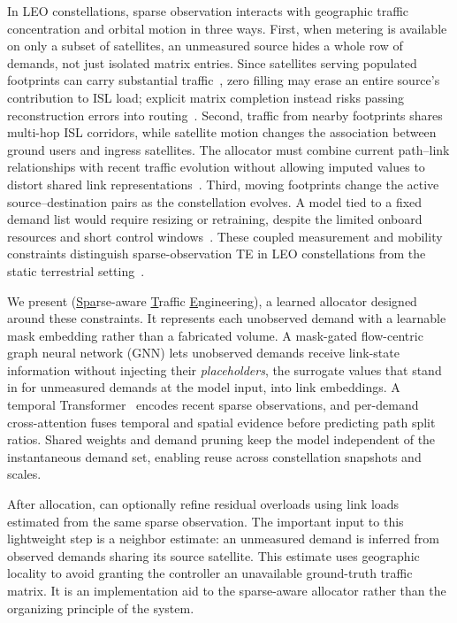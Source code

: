 In LEO constellations, sparse observation interacts with geographic traffic
concentration and orbital motion in three ways. First, when metering is
available on only a subset of satellites, an unmeasured source hides a whole
row of demands, not just isolated matrix entries. Since satellites serving
populated footprints can carry substantial traffic~\cite{kassing2020},
zero filling may erase an entire source's contribution to ISL load; explicit
matrix completion instead risks passing reconstruction errors into routing~\cite{zhang2009}.
Second, traffic from nearby footprints shares multi-hop ISL corridors, while
satellite motion changes the association between ground users and ingress
satellites. The allocator must combine current path--link relationships with
recent traffic evolution without allowing imputed values to distort shared
link representations~\cite{t2gnn}. Third, moving footprints change the active
source--destination pairs as the constellation evolves. A model tied to a
fixed demand list would require resizing or retraining, despite the limited
onboard resources and short control windows~\cite{sate}. These coupled
measurement and mobility constraints distinguish sparse-observation TE in
LEO constellations from the static terrestrial setting~\cite{test}.

We present \sysname{} (\underline{Spa}rse-aware \underline{T}raffic
\underline{E}ngineering), a learned allocator designed around these
constraints. It represents each unobserved demand with a learnable mask
embedding rather than a fabricated volume. A mask-gated flow-centric graph
neural network (GNN) lets unobserved demands receive
link-state information without injecting their \emph{placeholders}, the
surrogate values that stand in for unmeasured demands at the model input,
into link embeddings. A temporal Transformer~\cite{vaswani2017} encodes
recent sparse observations, and per-demand cross-attention fuses temporal
and spatial evidence before predicting path split ratios. Shared weights
and demand pruning keep the model independent of the instantaneous demand
set, enabling reuse across constellation snapshots and scales.

After allocation, \sysname{} can optionally refine residual overloads using
link loads estimated from the same sparse observation. The important input
to this lightweight step is a neighbor estimate: an unmeasured demand is
inferred from observed demands sharing its source satellite. This estimate
uses geographic locality to avoid granting the controller an unavailable
ground-truth traffic matrix. It is an implementation aid to the sparse-aware
allocator rather than the organizing principle of the system.


